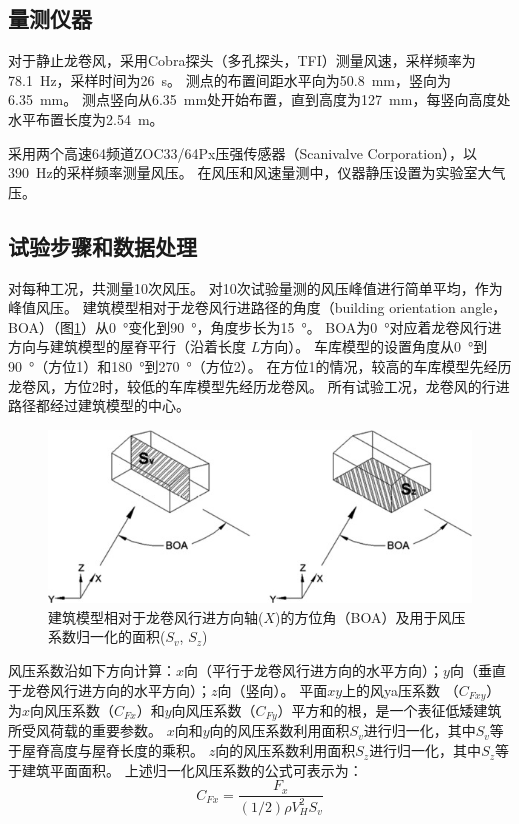 \documentclass{ctexart}
\begin{document}

\subsection{量测仪器}
对于静止龙卷风，采用Cobra探头（多孔探头，TFI\textregistered ）测量风速，采样频率为\SI{78.1}{Hz}，采样时间为\SI{26}{s}。
测点的布置间距水平向为\SI{50.8}{mm}，竖向为\SI{6.35}{mm}。
测点竖向从\SI{6.35}{mm}处开始布置，直到高度为\SI{127}{mm}，每竖向高度处水平布置长度为\SI{2.54}{m}。

采用两个高速64频道ZOC33/64Px压强传感器（Scanivalve Corporation\textregistered ），以\SI{390}{Hz}的采样频率测量风压。
在风压和风速量测中，仪器静压设置为实验室大气压。

\subsection{试验步骤和数据处理}
对每种工况，共测量10次风压。
对10次试验量测的风压峰值进行简单平均，作为峰值风压。
建筑模型相对于龙卷风行进路径的角度（building orientation angle，BOA）（图\ref{fig:BOA}）从\SI{0}{\degree}变化到\SI{90}{\degree}，角度步长为\SI{15}{\degree}。
BOA为\SI{0}{\degree}对应着龙卷风行进方向与建筑模型的屋脊平行（沿着长度 $L$方向）。
车库模型的设置角度从\SI{0}{\degree}到\SI{90}{\degree}（方位1）和\SI{180}{\degree}到\SI{270}{\degree}（方位2）。
在方位1的情况，较高的车库模型先经历龙卷风，方位2时，较低的车库模型先经历龙卷风。
所有试验工况，龙卷风的行进路径都经过建筑模型的中心。

\begin{figure}
\centering
\includegraphics{./fig/3}
\caption{建筑模型相对于龙卷风行进方向轴($X$)的方位角（BOA）及用于风压系数归一化的面积($S_v$, $S_z$)}
\label{fig:BOA}
\end{figure}


风压系数沿如下方向计算：$x$向（平行于龙卷风行进方向的水平方向）；$y$向（垂直于龙卷风行进方向的水平方向）；$z$向（竖向）。
平面$xy$上的风ya压系数 （$C_{Fxy}$）为$x$向风压系数（$C_{Fx}$）和$y$向风压系数（$C_{Fy}$）平方和的根，是一个表征低矮建筑所受风荷载的重要参数。
$x$向和$y$向的风压系数利用面积$S_v$进行归一化，其中$S_v$等于屋脊高度与屋脊长度的乘积。
$z$向的风压系数利用面积$S_z$进行归一化，其中$S_z$等于建筑平面面积。
上述归一化风压系数的公式可表示为：
\begin{equation}
	C_{Fx}=\frac{F_x}{(1/2)\rho V_H^2 S_v}
\end{equation}
\end{document}
